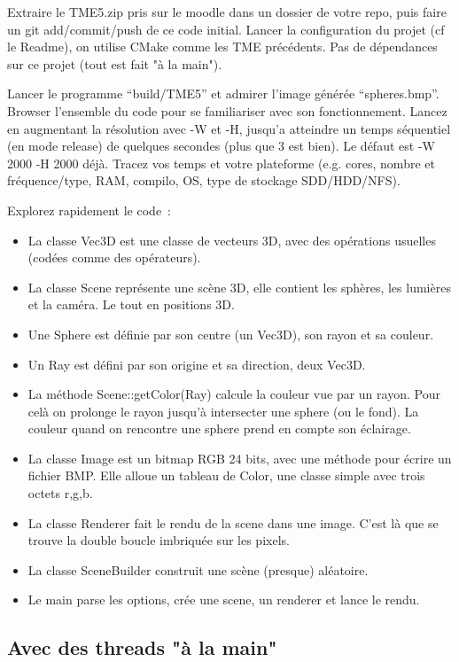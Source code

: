 \question Extraire le TME5.zip pris sur le moodle dans un dossier de votre repo, puis faire un git add/commit/push de ce code initial.
Lancer la configuration du projet (cf le Readme), on utilise CMake comme les TME précédents. 
Pas de dépendances sur ce projet (tout est fait "à la main"). 

\question Lancer le programme ``build/TME5'' et admirer l'image générée ``spheres.bmp''.
Browser l'ensemble du code pour se familiariser avec son fonctionnement. 
Lancez en augmentant la résolution avec -W et -H, jusqu'a atteindre un temps séquentiel (en mode release) de quelques secondes (plus que 3 est bien). Le défaut est -W 2000 -H 2000 déjà.
Tracez vos temps et votre plateforme (e.g. cores, nombre et fréquence/type, RAM, compilo, OS, type de stockage SDD/HDD/NFS).


Explorez rapidement le code~:
\begin{itemize}
\item La classe Vec3D est une classe de vecteurs 3D, avec des opérations usuelles (codées comme des opérateurs). 
\item La classe Scene représente une scène 3D, elle contient les sphères, les lumières et la caméra. Le tout en positions 3D.
\item Une Sphere est définie par son centre (un Vec3D), son rayon et sa couleur.
\item Un Ray est défini par son origine et sa direction, deux Vec3D.
\item La méthode Scene::getColor(Ray) calcule la couleur vue par un rayon. 
Pour celà on prolonge le rayon jusqu'à intersecter une sphere (ou le fond). 
La couleur quand on rencontre une sphere prend en compte son éclairage.
\item La classe Image est un bitmap RGB 24 bits, avec une méthode pour écrire un fichier BMP.
Elle alloue un tableau de Color, une classe simple avec trois octets r,g,b.
\item La classe Renderer fait le rendu de la scene dans une image. C'est là que se trouve la double boucle imbriquée sur les pixels.
\item La classe SceneBuilder construit une scène (presque) aléatoire.
\item Le main parse les options, crée une scene, un renderer et lance le rendu.
\end{itemize}

\subsection{Avec des threads "à la main"}

